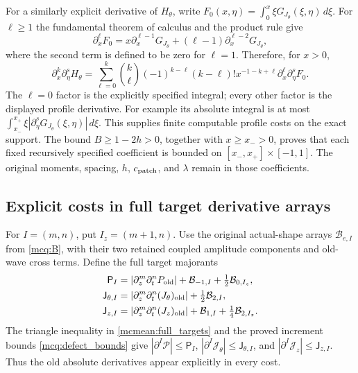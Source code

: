 \documentclass[11pt]{article}
\begin{document}
For a similarly explicit derivative of \(H_\theta\), write
\(F_0(x,\eta)=\int_0^x\xi G_{J_\theta}(\xi,\eta)\,d\xi\).
For \(\ell\ge1\) the fundamental theorem of calculus and the
product rule give
\[
 \partial_x^\ell F_0=x\partial_x^{\ell-1}G_{J_\theta}
              +(\ell-1)\partial_x^{\ell-2}G_{J_\theta},
\]
where the second term is defined to be zero for \(\ell=1\).
Therefore, for \(x>0\),
\begin{equation}\label{mcmean:H_derivatives}
 \partial_x^k\partial_\eta^sH_\theta
 =\sum_{\ell=0}^k\binom k\ell(-1)^{k-\ell}(k-\ell)!
    x^{-1-k+\ell}\partial_x^\ell\partial_\eta^sF_0.
\end{equation}
The \(\ell=0\) factor is the explicitly specified integral; every
other factor is the displayed profile derivative. For example its
absolute integral is at most
\(\int_{x_-}^{x_+}\xi|\partial_\eta^sG_{J_\theta}(\xi,\eta)|\,d\xi\).
This supplies finite computable profile costs on the exact support.
The bound \(B\ge1-2h>0\), together with \(x\ge x_->0\), proves
that each fixed recursively specified coefficient is bounded on
\([x_-,x_+]\times[-1,1]\). The original moments, spacing, \(h\),
\(c_{\rm patch}\), and \(\lambda\) remain in those coefficients.

\subsection{Explicit costs in full target derivative arrays}

For \(I=(m,n)\), put \(I_z=(m+1,n)\). Use the original actual-shape
arrays \(\mathcal B_{e,I}\) from \eqref{mcq:B}, with their two
retained coupled amplitude components and old-wave cross terms.
Define the full target majorants
\begin{equation}\label{mcmean:target_arrays}
\begin{split}
 \mathsf P_I&=|\partial_z^m\partial_t^nP_{\rm old}|
          +\mathcal B_{-1,I}+\tfrac12\mathcal B_{0,I_z},\\
 \mathsf J_{\theta,I}
      &=|\partial_z^m\partial_t^n(J_\theta)_{\rm old}|
          +\tfrac12\mathcal B_{2,I},\\
 \mathsf J_{z,I}
      &=|\partial_z^m\partial_t^n(J_z)_{\rm old}|
          +\mathcal B_{1,I}+\tfrac14\mathcal B_{2,I_z}.
\end{split}
\end{equation}
The triangle inequality in \eqref{mcmean:full_targets} and the
proved increment bounds \eqref{mcq:defect_bounds} give
\(|\partial^I\mathcal P|\le\mathsf P_I\),
\(|\partial^I\mathcal J_\theta|\le\mathsf J_{\theta,I}\), and
\(|\partial^I\mathcal J_z|\le\mathsf J_{z,I}\).
Thus the old absolute derivatives appear explicitly in every cost.
\end{document}
